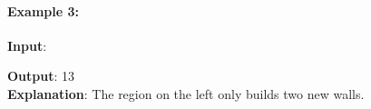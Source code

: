 \paragraph{Example 3:}
\begin{flushleft}
\textbf{Input}:
\begin{figure}[H]
\end{figure}
\textbf{Output}: 13
\\
\textbf{Explanation}: The region on the left only builds two new walls.
\end{flushleft}